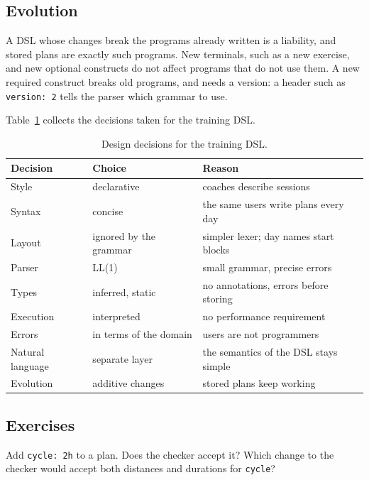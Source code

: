 \subsection{Evolution}

A DSL whose changes break the programs already written is a liability, and
stored plans are exactly such programs. New terminals, such as a new exercise,
and new optional constructs do not affect programs that do not use them. A
new required construct breaks old programs, and needs a version: a header such
as \texttt{version: 2} tells the parser which grammar to use.

Table~\ref{tab:decisions} collects the decisions taken for the training DSL.

\begin{table}[h]
\centering
\begin{tabular}{@{}p{3.4cm}p{3.4cm}p{6cm}@{}}
\toprule
Decision & Choice & Reason \\
\midrule
Style & declarative & coaches describe sessions \\
Syntax & concise & the same users write plans every day \\
Layout & ignored by the grammar & simpler lexer; day names start blocks \\
Parser & LL(1) & small grammar, precise errors \\
Types & inferred, static & no annotations, errors before storing \\
Execution & interpreted & no performance requirement \\
Errors & in terms of the domain & users are not programmers \\
Natural language & separate layer & the semantics of the DSL stays simple \\
Evolution & additive changes & stored plans keep working \\
\bottomrule
\end{tabular}
\caption{Design decisions for the training DSL.}
\label{tab:decisions}
\end{table}

\subsection{Exercises}

\begin{exercise}
Add \texttt{cycle: 2h} to a plan. Does the checker accept it? Which change to
the checker would accept both distances and durations for \texttt{cycle}?
\end{exercise}

